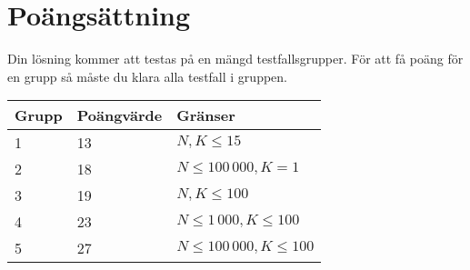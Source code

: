 \section*{Poängsättning}
Din lösning kommer att testas på en mängd testfallsgrupper. För att få poäng för en grupp så måste du klara alla testfall i gruppen.

\begin{tabular}{| l | l | l |}
\hline
Grupp & Poängvärde & Gränser\\ \hline
1     & 13         & $ N, K \le 15 $ \\ \hline
2     & 18         & $ N \le 100\,000, K = 1 $ \\ \hline
3     & 19         & $ N, K \le 100 $ \\ \hline
4     & 23         & $ N \le 1\,000, K \le 100 $ \\ \hline
5     & 27         & $ N \le 100\,000, K \le 100 $ \\ \hline
\end{tabular}
